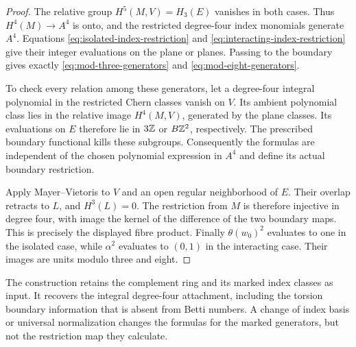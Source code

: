 \begin{proof}
The relative group $H^5(M,V)=H_3(E)$ vanishes
in both cases. Thus $H^4(M)\to A^4$ is onto,
and the restricted degree-four index monomials
generate $A^4$. Equations
\eqref{eq:isolated-index-restriction} and
\eqref{eq:interacting-index-restriction} give their
integer evaluations on the plane or planes.
Passing to the boundary gives exactly
\eqref{eq:mod-three-generators} and
\eqref{eq:mod-eight-generators}.

To check every relation among these generators,
let a degree-four integral polynomial in the
restricted Chern classes vanish on $V$. Its
ambient polynomial class lies in the relative
image $H^4(M,V)$, generated by the plane classes.
Its evaluations on $E$ therefore lie in
$3\mathbb Z$ or $B\mathbb Z^2$, respectively. The prescribed
boundary functional kills these subgroups.
Consequently the formulas are independent of the
chosen polynomial expression in $A^4$ and
define its actual boundary restriction.

Apply Mayer--Vietoris to $V$ and an open regular
neighborhood of $E$. Their overlap retracts to
$L$, and $H^3(L)=0$. The restriction from $M$
is therefore injective in degree four, with image
the kernel of the difference of the two boundary
maps. This is precisely the displayed fibre
product. Finally $\theta(w_0)^2$ evaluates to one
in the isolated case, while $\alpha^2$ evaluates
to $(0,1)$ in the interacting case. Their images
are units modulo three and eight.
\end{proof}

The construction retains the complement ring and
its marked index classes as input. It recovers
the integral degree-four attachment, including
the torsion boundary information that is absent
from Betti numbers. A change of index basis or
universal normalization changes the formulas for
the marked generators, but not the restriction
map they calculate.
